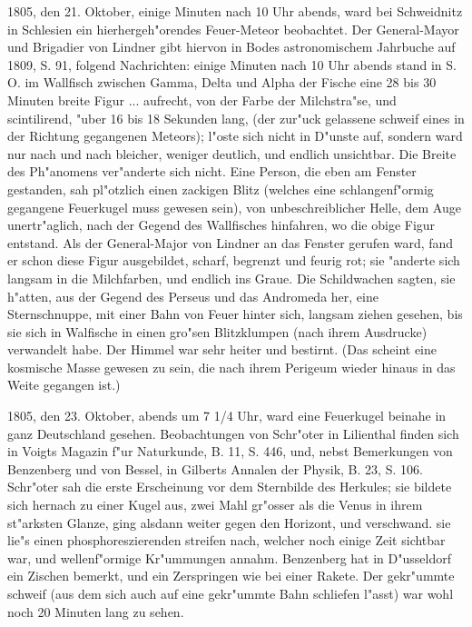 \documentclass[a4paper, 11pt, oneside, polutonikogreek, german]{article}
\begin{document}
1805, den 21. Oktober, einige Minuten nach 10 Uhr abends, ward bei Schweidnitz in Schlesien ein hierhergeh"orendes Feuer-Meteor beobachtet. Der General-Mayor und Brigadier von Lindner gibt hiervon in Bodes astronomischem Jahrbuche auf 1809, S. 91, folgend Nachrichten: einige Minuten nach 10 Uhr abends stand in S. O. im Wallfisch zwischen Gamma, Delta und Alpha der Fische eine 28 bis 30 Minuten breite Figur ... aufrecht, von der Farbe der Milchstra"se, und scintilirend, "uber 16 bis 18 Sekunden lang, (der zur"uck gelassene schweif eines in der Richtung gegangenen Meteors); l"oste sich nicht in D"unste auf, sondern ward nur nach und nach bleicher, weniger deutlich, und endlich unsichtbar. Die Breite des Ph"anomens ver"anderte sich nicht. Eine Person, die eben am Fenster gestanden, sah pl"otzlich einen zackigen Blitz (welches eine schlangenf"ormig gegangene Feuerkugel muss gewesen sein), von unbeschreiblicher Helle, dem Auge unertr"aglich, nach der Gegend des Wallfisches hinfahren, wo die obige Figur entstand. Als der General-Major von Lindner an das Fenster gerufen ward, fand er schon diese Figur ausgebildet, scharf, begrenzt und feurig rot; sie "anderte sich langsam in die Milchfarben, und endlich ins Graue. Die Schildwachen sagten, sie h"atten, aus der Gegend des Perseus und das Andromeda her, eine Sternschnuppe, mit einer Bahn von Feuer hinter sich, langsam ziehen gesehen, bis sie sich in Walfische in einen gro"sen Blitzklumpen (nach ihrem Ausdrucke) verwandelt habe. Der Himmel war sehr heiter und bestirnt. (Das scheint eine kosmische Masse gewesen zu sein, die nach ihrem Perigeum wieder hinaus in das Weite gegangen ist.)

1805, den 23. Oktober, abends um 7 1/4 Uhr, ward eine Feuerkugel beinahe in ganz Deutschland gesehen. Beobachtungen von Schr"oter in Lilienthal finden sich in Voigts Magazin f"ur Naturkunde, B. 11, S. 446, und, nebst Bemerkungen von Benzenberg und von Bessel, in Gilberts Annalen der Physik, B. 23, S. 106. Schr"oter sah die erste Erscheinung vor dem Sternbilde des Herkules; sie bildete sich hernach zu einer Kugel aus, zwei Mahl gr"osser als die Venus in ihrem st"arksten Glanze, ging alsdann weiter gegen den Horizont, und verschwand. sie lie"s einen phosphoreszierenden streifen nach, welcher noch einige Zeit sichtbar war, und wellenf"ormige Kr"ummungen annahm. Benzenberg hat in D"usseldorf ein Zischen bemerkt, und ein Zerspringen wie bei einer Rakete. Der gekr"ummte schweif (aus dem sich auch auf eine gekr"ummte Bahn schliefen l"asst) war wohl noch 20 Minuten lang zu sehen.
\end{document}
